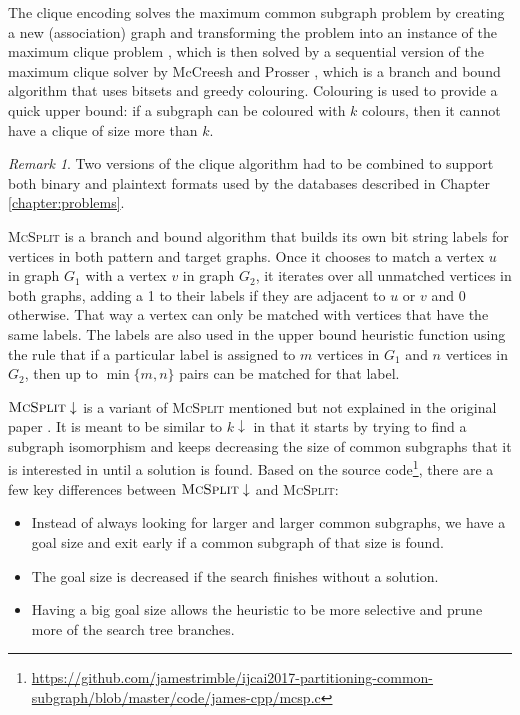 \documentclass{l4proj}
\theoremstyle{definition}
\theoremstyle{remark}
\newtheorem{remark}{Remark}[chapter]
\begin{document}
The clique encoding \cite{DBLP:conf/cp/McCreeshNPS16} solves the
maximum common subgraph problem by creating a new (association) graph and
transforming the problem into an instance of the maximum clique problem
\cite{Levi1973}, which is then solved by a sequential version of the maximum
clique solver by McCreesh and Prosser \cite{DBLP:journals/topc/McCreeshP15},
which is a branch and bound algorithm that uses bitsets and greedy colouring.
Colouring is used to provide a quick upper bound: if a subgraph can be coloured
with $k$ colours, then it cannot have a clique of size more than $k$.

\begin{remark}
  Two versions of the clique algorithm had to be combined to support both binary
  and plaintext formats used by the databases described in Chapter
  \ref{chapter:problems}.
\end{remark}

\textsc{McSplit} \cite{DBLP:conf/ijcai/McCreeshPT17} is a branch and bound
algorithm that builds its own bit string labels for vertices in both pattern and
target graphs. Once it chooses to match a vertex $u$ in graph $G_1$ with a
vertex $v$ in graph $G_2$, it iterates over all unmatched vertices in both
graphs, adding a 1 to their labels if they are adjacent to $u$ or $v$ and 0
otherwise. That way a vertex can only be matched with vertices that have the
same labels. The labels are also used in the upper bound heuristic function
using the rule that if a particular label is assigned to $m$ vertices in $G_1$
and $n$ vertices in $G_2$, then up to $\min \{ m, n \}$ pairs can be matched for
that label.

$\textsc{McSplit} \downarrow$ is a variant of \textsc{McSplit} mentioned but not
explained in the original paper \cite{DBLP:conf/ijcai/McCreeshPT17}. It is meant
to be similar to $k\downarrow$ in that it starts by trying to find a subgraph
isomorphism and keeps decreasing the size of common subgraphs that it is
interested in until a solution is found. Based on the source
code\footnote{\url{https://github.com/jamestrimble/ijcai2017-partitioning-common-subgraph/blob/master/code/james-cpp/mcsp.c}},
there are a few key differences between $\textsc{McSplit} \downarrow$ and
\textsc{McSplit}:
\begin{itemize}
\item Instead of always looking for larger and larger common subgraphs, we have
  a goal size and exit early if a common subgraph of that size is found.
\item The goal size is decreased if the search finishes without a solution.
\item Having a big goal size allows the heuristic to be more selective and prune
  more of the search tree branches.
\end{itemize}
\end{document}
